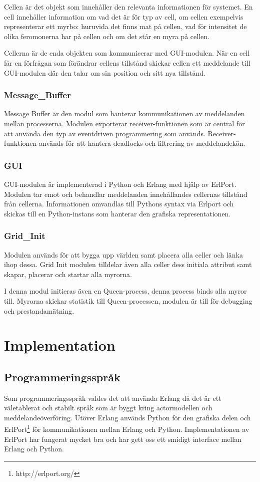 \documentclass[12pt]{article}
\begin{document}
Cellen är det objekt som innehåller den relevanta informationen för systemet.
En cell innehåller information om vad det är för typ av cell,
om cellen exempelvis representerar ett myrbo: huruvida det finns mat på cellen,
vad för intensitet de olika feromonerna har på cellen och om det står en myra på cellen.

Cellerna är de enda objekten som kommunicerar med GUI-modulen.
När en cell får en förfrågan som förändrar cellens tillstånd skickar cellen ett meddelande till GUI-modulen där den talar om sin position och sitt nya tillstånd.

\subsubsection{Message\_Buffer}
Message Buffer är den modul som hanterar kommunikationen av meddelanden mellan processerna.
Modulen exporterar receiver-funktionen som är central för att använda den typ av eventdriven programmering som används.
Receiver-funktionen används för att hantera deadlocks och filtrering av meddelandekön.

\subsubsection{GUI}
GUI-modulen är implementerad i Python och Erlang med hjälp av ErlPort.
Modulen tar emot och behandlar meddelanden innehållandes cellernas tillstånd från cellerna.
Informationen omvandlas till Pythons syntax via Erlport och skickas till en Python-instans som hanterar den grafiska representationen.

\subsubsection{Grid\_Init}
Modulen används för att bygga upp världen samt placera alla celler och länka ihop dessa.
Grid Init modulen tilldelar även alla celler dess initiala attribut samt skapar,
placerar och startar alla myrorna.

I denna modul initieras även en Queen-process,
denna process binds alla myror till.
Myrorna skickar statistik till Queen-processen,
modulen är till för debugging och prestandamätning.

\section{Implementation}\label{sec:implementation}
\subsection{Programmeringsspråk}
Som programmeringsspråk valdes det att använda Erlang då det är ett väletablerat och stabilt språk som är byggt kring actormodellen och meddelandeöverföring.
Utöver Erlang används Python för den grafiska delen och ErlPort\footnote{http://erlport.org/} för kommunikationen mellan Erlang och Python.
Implementationen av ErlPort har fungerat mycket bra och har gett oss ett smidigt interface mellan Erlang och Python.
\end{document}
